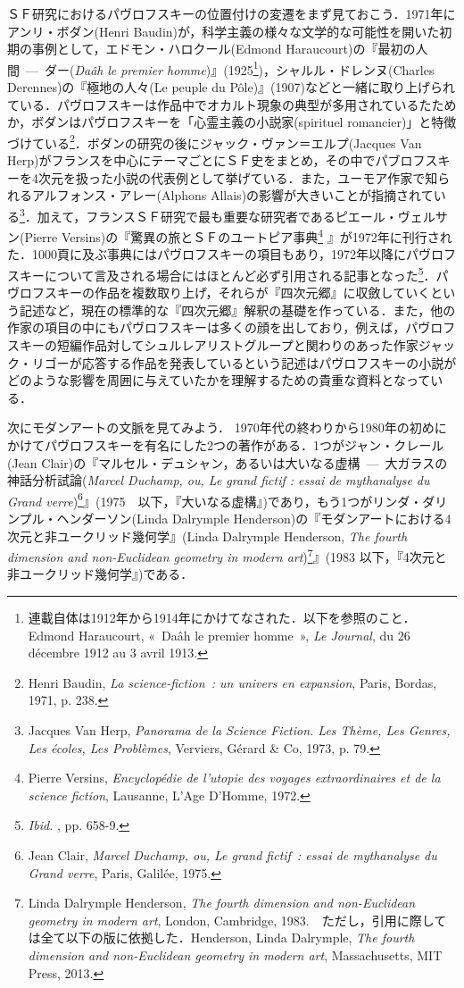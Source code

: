 ＳＦ研究におけるパヴロフスキーの位置付けの変遷をまず見ておこう．1971年にアンリ・ボダン(Henri Baudin)が，科学主義の様々な文学的な可能性を開いた初期の事例として，エドモン・ハロクール(Edmond Haraucourt)の『最初の人間~---~ダー(\emph{Daâh} \emph{le premier homme})』(1925\footnote{連載自体は1912年から1914年にかけてなされた．以下を参照のこと．Edmond Haraucourt, «~Daâh le premier homme~», \emph{Le Journal}, du 26 décembre 1912 au 3 avril 1913.})，シャルル・ドレンヌ(Charles Derennes)の『極地の人々(Le peuple du Pôle)』(1907)などと一緒に取り上げられている．パヴロフスキーは作品中でオカルト現象の典型が多用されているたためか，ボダンはパヴロフスキーを「心霊主義の小説家(spirituel romancier)」と特徴づけている\footnote{Henri Baudin, \emph{La science-fiction~: un univers en expansion}, Paris, Bordas, 1971, p. 238.}．ボダンの研究の後にジャック・ヴァン＝エルプ(Jacques Van Herp)がフランスを中心にテーマごとにＳＦ史をまとめ，その中でパブロフスキーを4次元を扱った小説の代表例として挙げている．また，ユーモア作家で知られるアルフォンス・アレー(Alphons Allais)の影響が大きいことが指摘されている\footnote{Jacques Van Herp, \emph{Panorama de la Science Fiction. Les Thème, Les Genres, Les écoles, Les Problèmes}, Verviers, Gérard \& Co, 1973, p. 79.}．加えて，フランスＳＦ研究で最も重要な研究者であるピエール・ヴェルサン(Pierre Versins)の『驚異の旅とＳＦのユートピア事典\footnote{Pierre Versins, \emph{Encyclopédie de l'utopie des voyages extraordinaires et de la science fiction}, Lausanne, L'Age D'Homme, 1972.} 』が1972年に刊行された．1000頁に及ぶ事典にはパヴロフスキーの項目もあり，1972年以降にパヴロフスキーについて言及される場合にはほとんど必ず引用される記事となった\footnote{\emph{Ibid. }, pp. 658-9.}．パヴロフスキーの作品を複数取り上げ，それらが『四次元郷』に収斂していくという記述など，現在の標準的な『四次元郷』解釈の基礎を作っている．また，他の作家の項目の中にもパヴロフスキーは多くの顔を出しており，例えば，パヴロフスキーの短編作品対してシュルレアリストグループと関わりのあった作家ジャック・リゴーが応答する作品を発表しているという記述はパヴロフスキーの小説がどのような影響を周囲に与えていたかを理解するための貴重な資料となっている．

次にモダンアートの文脈を見てみよう． 1970年代の終わりから1980年の初めにかけてパヴロフスキーを有名にした2つの著作がある．1つがジャン・クレール(Jean Clair)の『マルセル・デュシャン，あるいは大いなる虚構~---~大ガラスの神話分析試論(\emph{Marcel Duchamp, ou, Le grand fictif : essai de mythanalyse du Grand verre})\footnote{Jean Clair, \emph{Marcel Duchamp, ou, Le grand fictif~: essai de mythanalyse du Grand verre}, Paris, Galilée, 1975.}』(1975　以下，『大いなる虚構』)であり，もう1つがリンダ・ダリンプル・ヘンダーソン(Linda Dalrymple Henderson)の『モダンアートにおける4次元と非ユークリッド幾何学』(Linda Dalrymple Henderson, \emph{The fourth dimension and non-Euclidean geometry in modern art})\footnote{Linda Dalrymple Henderson, \emph{The fourth dimension and non-Euclidean geometry in modern art}, London, Cambridge, 1983.　ただし，引用に際しては全て以下の版に依拠した．Henderson, Linda Dalrymple, \emph{The fourth dimension and non-Euclidean geometry in modern art}, Massachusetts, MIT Press, 2013.}』(1983 以下，『4次元と非ユークリッド幾何学』)である．

